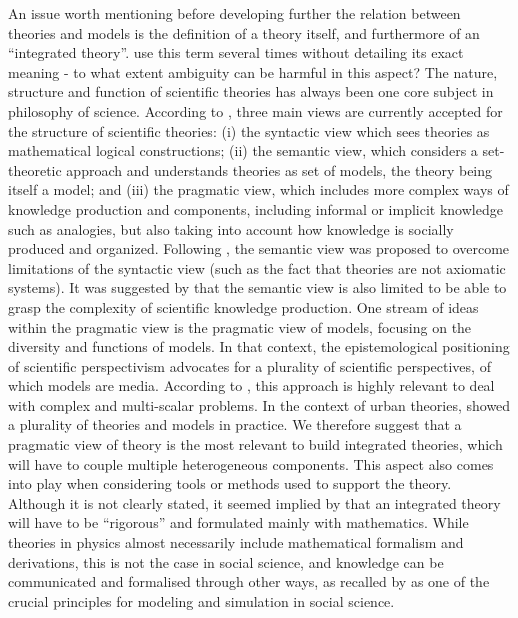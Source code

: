 \documentclass[10pt,letterpaper]{article}
\begin{document}
An issue worth mentioning before developing further the relation between theories and models is the definition of a theory itself, and furthermore of an ``integrated theory''. \citep{lobo2020urban} use this term several times without detailing its exact meaning - to what extent ambiguity can be harmful in this aspect? The nature, structure and function of scientific theories has always been one core subject in philosophy of science. According to \cite{winther2016structure}, three main views are currently accepted for the structure of scientific theories: (i) the syntactic view which sees theories as mathematical logical constructions; (ii) the semantic view, which considers a set-theoretic approach and understands theories as set of models, the theory being itself a model; and (iii) the pragmatic view, which includes more complex ways of knowledge production and components, including informal or implicit knowledge such as analogies, but also taking into account how knowledge is socially produced and organized. Following \cite{suppe2000understanding}, the semantic view was proposed to overcome limitations of the syntactic view (such as the fact that theories are not axiomatic systems). It was suggested by \citep{halvorson2012scientific} that the semantic view is also limited to be able to grasp the complexity of scientific knowledge production. One stream of ideas within the pragmatic view is the pragmatic view of models, focusing on the diversity and functions of models. In that context, the epistemological positioning of scientific perspectivism \citep{giere2010scientific} advocates for a plurality of scientific perspectives, of which models are media. According to \citep{callebaut2012scientific}, this approach is highly relevant to deal with complex and multi-scalar problems. In the context of urban theories, \citep{pumain2020conclusion} showed a plurality of theories and models in practice. We therefore suggest that a pragmatic view of theory is the most relevant to build integrated theories, which will have to couple multiple heterogeneous components. This aspect also comes into play when considering tools or methods used to support the theory. Although it is not clearly stated, it seemed implied by \citep{lobo2020urban} that an integrated theory will have to be ``rigorous'' and formulated mainly with mathematics. While theories in physics almost necessarily include mathematical formalism and derivations, this is not the case in social science, and knowledge can be communicated and formalised through other ways, as recalled by \cite{banos2013pour} as one of the crucial principles for modeling and simulation in social science.
\end{document}
